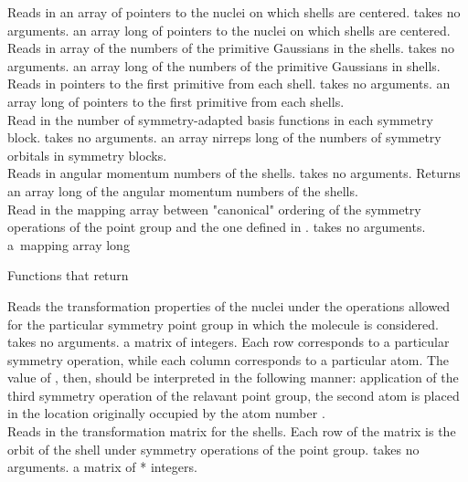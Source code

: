 {Reads in an array of pointers to the nuclei on which shells are centered.}
{takes no arguments.}
{an array  long of pointers to the nuclei on which shells
are centered.}
{Reads in array of the numbers of the primitive
Gaussians in the shells.}
{takes no arguments.}
{an array  long of the numbers of 
the primitive Gaussians in shells.} \\
{Reads in pointers to the first primitive
from each shell.}
{takes no arguments.}
{an array  long of pointers to the first 
primitive from each shells.} \\
{Read in the number of symmetry-adapted basis functions in each symmetry block.}
{takes no arguments.}
{an array nirreps long of the numbers of
symmetry orbitals in symmetry blocks.} \\
{Reads in angular momentum numbers of
the shells.}
{takes no arguments.}
{Returns an array  long of
the angular momentum numbers of the shells.} \\
{Read in the mapping array between "canonical" ordering
of the symmetry operations of the point group and the
one defined in .}
{takes no arguments.}
{a\ mapping array  long}

\begin{center}
Functions that return 
\end{center}
{Reads the transformation properties of the nuclei
under the operations allowed for the particular symmetry point group
in which the molecule is considered.}
{takes no arguments.}
{a matrix of integers. Each row corresponds
to a particular symmetry operation, while each column corresponds to
a particular atom.  The value of , then, should be interpreted
in the following manner: application of the third symmetry operation of 
the relavant point group, the second atom is placed in the location
originally occupied by the atom number .} \\
{Reads in the transformation matrix for the shells. Each row of the 
matrix is the orbit of the shell under symmetry operations of the point 
group.}
{takes no arguments.}
{a matrix of * integers.}

